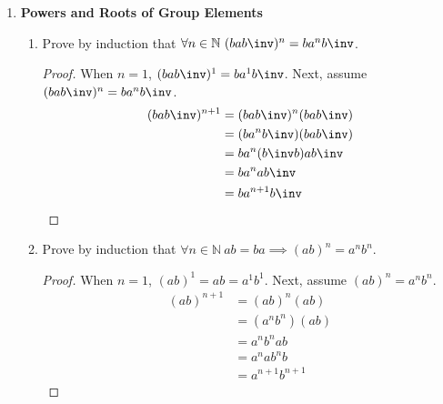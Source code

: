 \begin{enumerate}[label={\Alph*.},font={\bfseries}]
\begin{enumerate}[label={\arabic*},font={\bfseries}]
\begin{proof}
    \end{proof}
  \item Suppose $\forall g \in G\ g = g\inv$ and $\forall h \in H\ h = h\inv$. Prove that $\forall (g,h) \in G \times H\ (g,h) = (g,h)\inv$.
    \begin{proof}
      \begin{align*}
        (g,h)(g,h) &= (g,h)(g\inv,h\inv) \\
        &= (gg\inv,hh\inv) \\
        &= (e_G,e_H) = e_{G \times H} \\
        &= (g,h)(g,h)\inv \\
        (g,h) &= (g,h)\inv
      \end{align*}
    \end{proof}
  \end{enumerate}
\item {\bf Powers and Roots of Group Elements}
  \begin{enumerate}[label={\arabic*},font={\bfseries}]
  \item Prove by induction that $\forall n \in \mathbb{N}\ (bab\inv)^n = ba^nb\inv$.
    \begin{proof}
      When $n=1$, $(bab\inv)^1 = ba^1b\inv$. Next, assume $(bab\inv)^n = ba^nb\inv$.
      \begin{align*}
        (bab\inv)^{n+1} &= (bab\inv)^n(bab\inv) \\
        &= (ba^nb\inv)(bab\inv) \\
        &= ba^n({b\inv}b)ab\inv \\
        &= ba^nab\inv \\
        &= ba^{n+1}b\inv
      \end{align*}
    \end{proof}
  \item Prove by induction that $\forall n \in \mathbb{N}\ ab = ba \implies (ab)^n = a^nb^n$.
    \begin{proof}
      When $n=1$, $(ab)^1 = ab = a^1b^1$. Next, assume $(ab)^n = a^nb^n$.
      \begin{align*}
        (ab)^{n+1} &= (ab)^n(ab) \\
        &= (a^nb^n)(ab) \\
        &= a^nb^nab \\
        &= a^nab^nb \\
        &= a^{n+1}b^{n+1}
      \end{align*}

\end{proof}
\end{enumerate}
\end{enumerate}
